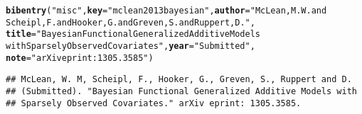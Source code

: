 \documentclass[article]{jss}\usepackage[]{graphicx}\usepackage[]{color}
\makeatletter
\newcommand{\hlstr}[1]{\textcolor[rgb]{0.125,0.125,1}{#1}}%
\newcommand{\hlstd}[1]{\textcolor[rgb]{0.251,0.251,0.282}{#1}}%
\newcommand{\hlkwc}[1]{\textcolor[rgb]{0.529,0,0.184}{\textbf{#1}}}%
\newcommand{\hlkwd}[1]{\textcolor[rgb]{0.251,0.251,0.282}{\textbf{#1}}}%
\newenvironment{kframe}{%
 \def\at@end@of@kframe{}%
 \ifinner\ifhmode%
  \def\at@end@of@kframe{\end{minipage}}%
  \begin{minipage}{\columnwidth}%
 \fi\fi%
 \def\FrameCommand##1{\hskip\@totalleftmargin \hskip-\fboxsep
 \colorbox{shadecolor}{##1}\hskip-\fboxsep
     \hskip-\linewidth \hskip-\@totalleftmargin \hskip\columnwidth}%
 \MakeFramed {\advance\hsize-\width
   \@totalleftmargin\z@ \linewidth\hsize
   \@setminipage}}%
 {\par\unskip\endMakeFramed%
 \at@end@of@kframe}
\newenvironment{knitrout}{}{} %
\makeatother
\begin{document}
\begin{knitrout}
\color{fgcolor}\begin{kframe}
\begin{alltt}
\hlkwd{bibentry}\hlstd{(}\hlstr{"misc"}\hlstd{,} \hlkwc{key} \hlstd{=} \hlstr{"mclean2013bayesian"}\hlstd{,} \hlkwc{author} \hlstd{=} \hlstr{"McLean, M. W. and 
         Scheipl, F. and Hooker, G. and Greven, S. and Ruppert, D."}\hlstd{,}
         \hlkwc{title} \hlstd{=} \hlstr{"Bayesian Functional Generalized Additive Models 
                 with Sparsely Observed Covariates"}\hlstd{,} \hlkwc{year} \hlstd{=} \hlstr{"Submitted"}\hlstd{,}
         \hlkwc{note} \hlstd{=} \hlstr{"arXiv eprint: 1305.3585"}\hlstd{)}
\end{alltt}
\begin{verbatim}
## McLean, W. M, Scheipl, F., Hooker, G., Greven, S., Ruppert and D.
## (Submitted). "Bayesian Functional Generalized Additive Models with
## Sparsely Observed Covariates." arXiv eprint: 1305.3585.
\end{verbatim}
\end{kframe}
\end{knitrout}
\end{document}
